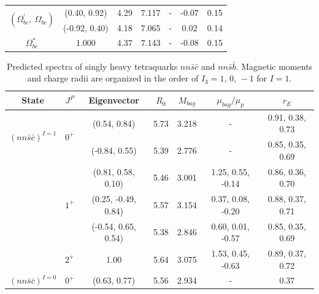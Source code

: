 \documentclass[prd,twocolumn,floatfix,nofootinbib]{revtex4}
\begin{document}
\begin{table}[!htbp]
\begin{tabular}{ccccccc}
        \multirow{2}{*}{$\left(\Omega_{bc}^{\prime},\ \Omega_{bc}\right)$}
                            &(0.40, 0.92)       &4.29	    &7.117	    &-          &-0.07                  &0.15 \\ 
                            &(-0.92, 0.40)      &4.18	    &7.065	    &-          &0.02                   &0.14 \\ 
        $\Omega_{bc}^{\ast}$&1.000              &4.37	    &7.143	    &-          &-0.08                  &0.15 \\ 
        \hline\hline
    \end{tabular}
\end{table}

\renewcommand{\tabcolsep}{0.62cm}
\renewcommand{\arraystretch}{1.3}
\begin{table}[!htbp]
    \caption{Predicted spectra of singly heavy tetraquarks $nn\bar{s}\bar{c}$ and $nn\bar{s}\bar{b}$. 
    Magnetic moments and charge radii are organized in the order of $I_{3}=1,\,0,\,-1$ for $I=1$.}
    \label{tab:1heavytetraquark}
    \begin{tabular}{ccccccc}
        \hline\hline
        {\rm State}     &$J^{P}$    &{\rm Eigenvector}      &$R_{0}$    &$M_{bag}$  &$\mu_{bag}/\mu_{p}$    &$r_{E}$ \\ \hline
        \multirow{2}{*}{${(nn\bar{s}\bar{c})}^{I=1}$}
                        &\multirow{2}{*}{$0^{+}$}
                                    &(0.54, 0.84)           &5.73	    &3.218	    &-                      &0.91, 0.38, 0.73 \\ 
                        &           &(-0.84, 0.55)          &5.39	    &2.776	    &-                      &0.85, 0.35, 0.69 \\ 
                        &\multirow{3}{*}{$1^{+}$}
                                    &(0.81, 0.58, 0.10)     &5.46	    &3.001	    &1.25, 0.55, -0.14      &0.86, 0.36, 0.70 \\ 
                        &           &(0.25, -0.49, 0.84)    &5.57	    &3.154	    &0.37, 0.08, -0.20      &0.88, 0.37, 0.71 \\ 
                        &           &(-0.54, 0.65, 0.54)    &5.38	    &2.846	    &0.60, 0.01, -0.57      &0.85, 0.35, 0.69 \\ 
                        &$2^{+}$    &1.00                   &5.64	    &3.075	    &1.53, 0.45, -0.63      &0.89, 0.37, 0.72 \\ 
        \multirow{2}{*}{${(nn\bar{s}\bar{c})}^{I=0}$}
                        &\multirow{2}{*}{$0^{+}$}
                                    &(0.63, 0.77)           &5.56	    &2.934	    &-                      &0.37 \\ 

\end{tabular}
\end{table}
\end{document}
